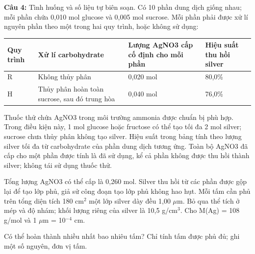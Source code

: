 \documentclass[12pt,a4paper]{article}
\begin{document}
\par\noindent\begin{minipage}{\linewidth}
\noindent\textbf{Câu 4:} Tình huống và số liệu tự biên soạn. Có 10 phần dung dịch giống nhau; mỗi phần chứa 0,010 mol glucose và 0,005 mol sucrose. Mỗi phần phải được xử lí nguyên phần theo một trong hai quy trình, hoặc không sử dụng:\par
\begin{center}\small\begin{tabularx}{\linewidth}{|X|X|X|X|}
\hline
Quy trình & Xử lí carbohydrate & Lượng AgNO3 cấp cố định cho mỗi phần & Hiệu suất thu hồi silver \\ \hline
R & Không thủy phân & 0,020 mol & 80,0\% \\ \hline
H & Thủy phân hoàn toàn sucrose, sau đó trung hòa & 0,040 mol & 76,0\% \\ \hline
\end{tabularx}\end{center}
Thuốc thử chứa AgNO3 trong môi trường ammonia được chuẩn bị phù hợp. Trong điều kiện này, 1 mol glucose hoặc fructose có thể tạo tối đa 2 mol silver; sucrose chưa thủy phân không tạo silver. Hiệu suất trong bảng tính theo lượng silver tối đa từ carbohydrate của phần dung dịch tương ứng. Toàn bộ AgNO3 đã cấp cho một phần được tính là đã sử dụng, kể cả phần không được thu hồi thành silver; không tái sử dụng thuốc thử.\par
Tổng lượng AgNO3 có thể cấp là 0,260 mol. Silver thu hồi từ các phần được gộp lại để tạo lớp phủ, giả sử công đoạn tạo lớp phủ không hao hụt. Mỗi tấm cần phủ trên tổng diện tích 180 cm$^{2}$ một lớp silver dày đều 1,00 \(\mu\)m. Bỏ qua thể tích ở mép và độ nhám; khối lượng riêng của silver là 10,5 g/cm$^{3}$. Cho M(Ag) = 108 g/mol và 1 \(\mu\)m = 10$^{-4}$ cm.\par
Có thể hoàn thành nhiều nhất bao nhiêu tấm? Chỉ tính tấm được phủ đủ; ghi một số nguyên, đơn vị tấm.\par
\end{minipage}\par\vspace{0.12cm}
\end{document}
